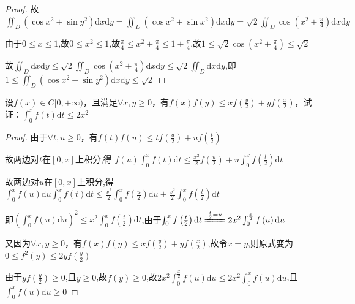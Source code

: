 \begin{xiti}
\begin{proof}
		故$\iint_{D}\left(\cos x^{2}+\sin y^{2}\right) \mathrm{d} x \mathrm{d} y = \iint_{D}\left(\cos x^{2}+\sin x^{2}\right) \mathrm{d} x \mathrm{d} y =\sqrt{2} \iint_{D} \cos \left(x^{2}+\frac{\pi}{4}\right) \mathrm{d} x \mathrm{d} y $
		
		由于$0 \leqslant x \leqslant 1$,故$0 \leqslant x^{2} \leqslant 1$,故$\frac{\pi}{4} \leqslant x^{2}+\frac{\pi}{4} \leqslant 1+\frac{\pi}{4}$,故$1 \leqslant \sqrt{2} \cos \left(x^{2}+\frac{\pi}{4}\right) \leqslant \sqrt{2}$
		
		故$\iint_{D} \mathrm{d} x \mathrm{d} y \leqslant \sqrt{2} \iint_{D} \cos \left(x^{2}+\frac{\pi}{4}\right) \mathrm{d} x \mathrm{d} y \leqslant \sqrt{2} \iint_{D} \mathrm{d} x \mathrm{d} y$,即$1\leqslant \iint_{D}\left(\cos x^{2}+\sin y^{2}\right) \mathrm{d} x \mathrm{d} y \leqslant \sqrt{2}$
	\end{proof}
	\item 	设$f(x) \in C[0,+\infty)$，且满足$\forall x, y \geqslant 0$，有$f(x) f(y) \leqslant x f\left(\frac{y}{2}\right)+y f\left(\frac{x}{2}\right)$，试证：$\int_{0}^{x} f(t) \mathrm{d} t \leqslant 2 x^{2}$
	\begin{proof}
		由于$\forall t, u \geqslant 0$，有$f(t) f(u) \leqslant t f\left(\frac{u}{2}\right)+u f\left(\frac{t}{2}\right)$
		
		故两边对$t$在$[0,x]$上积分,得
		$f(u) \int_{0}^{x} f(t) \mathrm{d} t \leqslant \frac{x^{2}}{2} f\left(\frac{u}{2}\right) + u \int_{0}^{x} f\left(\frac{t}{2}\right) \mathrm{d} t$
		
		故两边对$u$在$[0,x]$上积分,得
		$\int_{0}^{x} f(u) \mathrm{d} u \int_{0}^{x} f(t) \mathrm{d} t \leqslant \frac{x^{2}}{2} \int_{0}^{x} f\left(\frac{u}{2}\right) \mathrm{d} u + \frac{x^{2}}{2} \int_{0}^{x} f\left(\frac{t}{2}\right) \mathrm{d} t $
		
		即$\left(\int_{0}^{x} f(u) \mathrm{d} u\right)^{2} \leqslant x^{2} \int_{0}^{x} f\left(\frac{t}{2}\right) \mathrm{d} t$,由于$\int_{0}^{x} f\left(\frac{t}{2}\right) \mathrm{d} t \xlongequal{\frac{t}{2}=u} 2x^{2}\int_{0}^{\frac{x}{2}} f\left(u\right) \mathrm{d} u$
		
		又因为$\forall x, y \geqslant 0$，有$f(x) f(y) \leqslant x f\left(\frac{y}{2}\right)+y f\left(\frac{x}{2}\right)$,故令$x=y$,则原式变为$0 \leqslant f^{2} (y) \leqslant 2 y f\left(\frac{y}{2}\right)$
		
		由于$yf\left(\frac{y}{2}\right) \geqslant 0$,且$y \geqslant 0$,故$f(y) \geqslant 0$,故$2x^{2}\int_{0}^{\frac{x}{2}} f\left(u\right) \mathrm{d} u \leqslant 2x^{2}\int_{0}^{x} f\left(u\right) \mathrm{d} u$,且$\int_{0}^{x} f\left(u\right) \mathrm{d} u \geqslant 0$
		

\end{proof}
\end{xiti}
